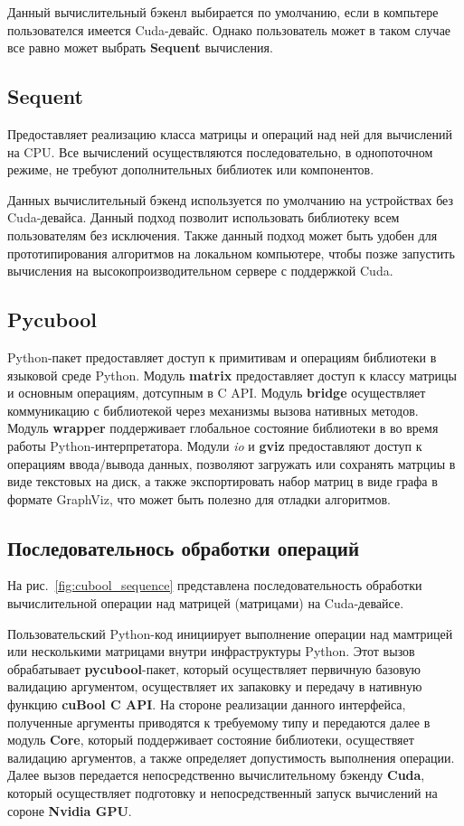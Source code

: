 Данный вычислительный бэкенл выбирается по умолчанию, если в компьтере пользователся имеется Cuda-девайс.
Однако пользователь может в таком случае все равно может выбрать \textbf{Sequent} вычисления. 

\subsection*{Sequent}

Предоставляет реализацию класса матрицы и операций над ней для вычислений на CPU. Все вычислений осуществляются последовательно, в однопоточном режиме, не требуют дополнительных библиотек или компонентов.

Данных вычислительный бэкенд используется по умолчанию на устройствах без Cuda-девайса. Данный подход позволит использовать библиотеку всем пользователям без исключения. Также данный подход может быть удобен для прототипирования алгоритмов на локальном компьютере, чтобы позже запустить вычисления на высокопроизводительном сервере с поддержкой Cuda.

\subsection*{Pycubool}

Python-пакет предоставляет доступ к примитивам и операциям библиотеки в языковой среде Python.
Модуль \textbf{matrix} предоставляет доступ к классу матрицы и основным операциям, дотсупным в C API.
Модуль \textbf{bridge} осуществляет коммуникацию с библиотекой через механизмы вызова нативных методов. Модуль \textbf{wrapper} поддерживает глобальное состояние библиотеки в во время работы Python-интерпретатора. Модули \textit{io} и \textbf{gviz} предоставляют доступ к операциям ввода/вывода данных, позволяют загружать или сохранять матрциы в виде текстовых на диск, а также экспортировать набор матриц в виде графа в формате GraphViz, что может быть полезно для отладки алгоритмов.

\subsection{Последовательнось обработки операций}

На рис.~\ref{fig:cubool_sequence} представлена последовательность обработки вычислительной операции над матрицей (матрицами) на Cuda-девайсе. 

Пользовательский Python-код инициирует выполнение операции над мамтрицей или несколькими матрицами внутри инфраструктуры Python. Этот вызов обрабатывает \textbf{pycubool}-пакет, который осуществляет первичную базовую валидацию аргументом, осуществляет их запаковку и передачу в нативную функцию \textbf{cuBool C API}. На стороне реализации данного интерфейса, полученные аргументы приводятся к требуемому типу и передаются далее в модуль \textbf{Core}, который поддерживает состояние библиотеки, осуществяет валидацию аргументов, а также определяет допустимость выполнения операции. Далее вызов передается непосредственно вычислительному бэкенду \textbf{Cuda}, который осуществляет подготовку и непосредственный запуск вычислений на сороне \textbf{Nvidia GPU}. 

